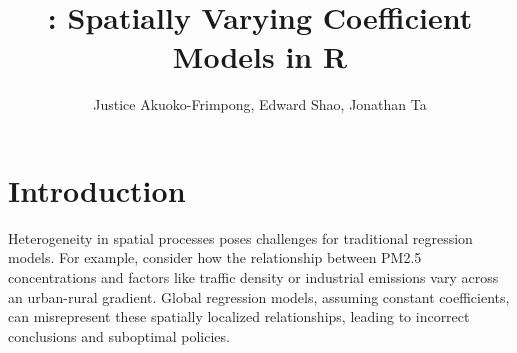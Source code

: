 



\addtolength{\oddsidemargin}{-.5in}%
\addtolength{\evensidemargin}{-1in}%
\addtolength{\textwidth}{1in}%
\addtolength{\textheight}{1.7in}%
\addtolength{\topmargin}{-1in}%



\def\spacingset#1{\renewcommand{\baselinestretch}%
{#1}\small\normalsize} \spacingset{1}

\date{}

\newcommand{\footremember}[2]{%
    \footnote{#2}
    \newcounter{#1}
    \setcounter{#1}{\value{footnote}}%
}
\newcommand{\footrecall}[1]{%
    \footnotemark[\value{#1}]%
} 

\newcommand{\bbE}{\mathbb{E}}
\newcommand{\bbR}{\mathbb{R}}
\newcommand{\bX}{\boldsymbol{X}}
\newcommand{\bs}{\boldsymbol{s}}
\newcommand{\bw}{\boldsymbol{w}}
\newcommand{\bc}{\boldsymbol{c}}
\newcommand{\btheta}{\boldsymbol{\theta}}
\newcommand{\wtilde}{\tilde{w}}
\newcommand{\Ytilde}{\tilde{Y}}

\newcommand{\mytitle}{: Spatially Varying Coefficient Models in R}  

\title{\bf \mytitle}
\author{Justice Akuoko-Frimpong, Edward Shao, Jonathan Ta}

\maketitle


\spacingset{1.9} %
\section{Introduction}
\label{sec:intro}

Heterogeneity in spatial processes poses challenges for traditional regression models. For example, consider how the relationship between PM2.5 concentrations and factors like traffic density or industrial emissions vary across an urban-rural gradient. Global regression models, assuming constant coefficients, can misrepresent these spatially localized relationships, leading to incorrect conclusions and suboptimal policies.


